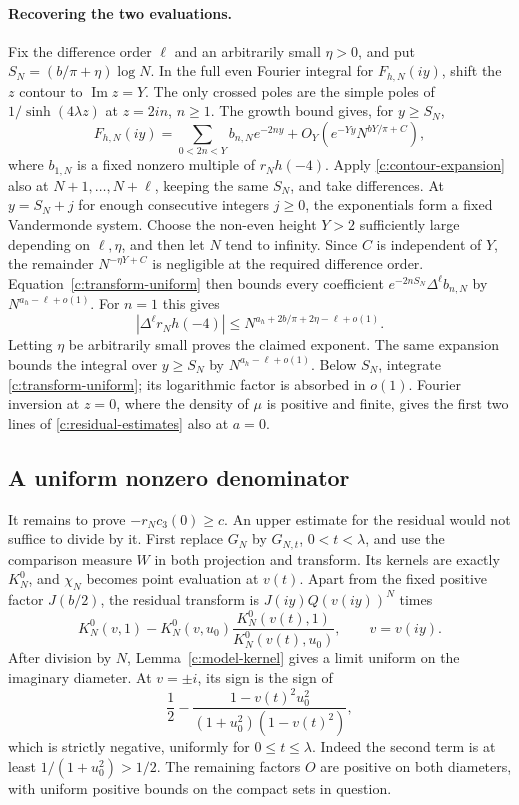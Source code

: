\paragraph{Recovering the two evaluations.}
Fix the difference order $\ell$ and an arbitrarily small $\eta>0$, and
put $S_N=(b/\pi+\eta)\log N$.  In the full even Fourier integral for
$F_{h,N}(iy)$, shift the $z$ contour to $\operatorname{Im}z=Y$.
The only crossed poles are the simple poles of $1/\sinh(4\lambda z)$
at $z=2in$, $n\ge1$.  The growth bound gives, for $y\ge S_N$,
\begin{equation}\label{c:contour-expansion}
 F_{h,N}(iy)=\sum_{0<2n<Y}b_{n,N}e^{-2ny}
                  +O_Y(e^{-Yy}N^{bY/\pi+C}),
\end{equation}
where $b_{1,N}$ is a fixed nonzero multiple of $r_Nh(-4)$.
Apply \eqref{c:contour-expansion} also at $N+1,\ldots,N+\ell$,
keeping the same $S_N$, and take differences.  At
$y=S_N+j$ for enough consecutive integers $j\ge0$, the exponentials
form a fixed Vandermonde system.  Choose the non-even height $Y>2$
sufficiently large depending on $\ell,\eta$, and then let $N$ tend to
infinity.  Since $C$ is independent of $Y$, the remainder
$N^{-\eta Y+C}$ is negligible at the required difference order.
Equation~\eqref{c:transform-uniform} then bounds every coefficient
$e^{-2nS_N}\Delta^\ell b_{n,N}$ by
$N^{a_h-\ell+o(1)}$.  For $n=1$ this gives
\[
 |\Delta^\ell r_Nh(-4)|
 \le N^{a_h+2b/\pi+2\eta-\ell+o(1)}.
\]
Letting $\eta$ be arbitrarily small proves the claimed exponent.
The same expansion bounds the integral over $y\ge S_N$ by
$N^{a_h-\ell+o(1)}$.  Below $S_N$, integrate
\eqref{c:transform-uniform}; its logarithmic factor is absorbed in
$o(1)$.  Fourier inversion at $z=0$, where the density of $\mu$ is
positive and finite, gives the first two lines of
\eqref{c:residual-estimates} also at $a=0$.

\subsection{A uniform nonzero denominator}

It remains to prove $-r_Nc_3(0)\ge c$.  An upper estimate for the
residual would not suffice to divide by it.
First replace $G_N$ by $G_{N,t}$, $0<t<\lambda$, and use the
comparison measure $W$ in both projection and transform.  Its kernels
are exactly $K_N^0$, and $\chi_N$ becomes point evaluation at $v(t)$.
Apart from the fixed positive factor $J(b/2)$, the residual transform is
$J(iy)Q(v(iy))^N$ times
\[
 K_N^0(v,1)-K_N^0(v,u_0)
          \frac{K_N^0(v(t),1)}{K_N^0(v(t),u_0)},
 \qquad v=v(iy).
\]
After division by $N$, Lemma~\ref{c:model-kernel} gives a limit
uniform on the imaginary diameter.  At $v=\pm i$, its sign is the
sign of
\[
 \frac12-
 \frac{1-v(t)^2u_0^2}{(1+u_0^2)(1-v(t)^2)},
\]
which is strictly negative, uniformly for $0\le t\le\lambda$.
Indeed the second term is at least $1/(1+u_0^2)>1/2$.
The remaining factors $O$ are positive on both diameters, with uniform
positive bounds on the compact sets in question.


